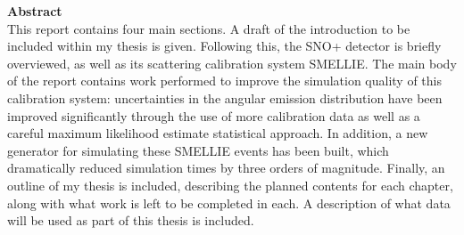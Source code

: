 	\normalsize\textbf{Abstract}\\
	This report contains four main sections. A draft of the introduction to be included within my thesis is given. Following this, the SNO+ detector is briefly overviewed, as well as its scattering calibration system SMELLIE. The main body of the report contains work performed to improve the simulation quality of this calibration system: uncertainties in the angular emission distribution have been improved significantly through the use of more calibration data as well as a careful maximum likelihood estimate statistical approach. In addition, a new generator for simulating these SMELLIE events has been built, which dramatically reduced simulation times by three orders of magnitude. Finally, an outline of my thesis is included, describing the planned contents for each chapter, along with what work is left to be completed in each. A description of what data will be used as part of this thesis is included.
